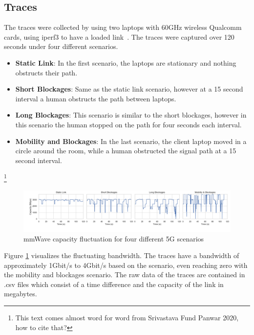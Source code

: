 \documentclass[a4paper,english, 11pt]{report}
\begin{document}
\subsection{Traces}
The traces were collected by using two laptops with 60GHz wireless Qualcomm cards, using iperf3 to have a loaded link~\cite{Srivastava_Fund_Panwar_2020}. The traces were captured over 120 seconds under four different scenarios.

\begin{itemize}
  \item \textbf{Static Link}: In the first scenario, the laptops are stationary and nothing obstructs their path.
  \item \textbf{Short Blockages}: Same as the static link scenario, however at a 15 second interval a human obstructs the path between laptops.
  \item \textbf{Long Blockages}: This scenario is similar to the short blockages, however in this scenario the human stopped on the path for four seconds each interval.
  \item \textbf{Mobility and Blockages}: In the last scenario, the client laptop moved in a circle around the room, while a human obstructed the signal path at a 15 second interval.
\end{itemize}\footnote{This text comes almost word for word from Srivastava Fund Panwar 2020, how to cite that?}


\begin{figure}[h!] %
	\centering
	\includegraphics[scale=0.33]{../diagrams/witestlab/mmwave_cap2.png}
  	\caption{mmWave capacity fluctuation for four different 5G scenarios}
  	\label{fig:witestlab_graph1}
\end{figure}

Figure \ref{fig:witestlab_graph1} visualizes the fluctuating bandwidth. The traces have a bandwidth of approximately 1Gbit/s to 4Gbit/s based on the scenario, even reaching zero with the mobility and blockages scenario. The raw data of the traces are contained in .csv files which consist of a time difference and the capacity of the link in megabytes.
\end{document}
